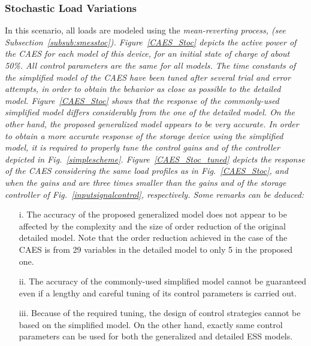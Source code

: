 \documentclass[journal, a4paper]{IEEEtran}
\begin{document}
\subsubsection{Stochastic Load Variations}
\label{subsub:caesstoc}
In this scenario, all loads are modeled using the \it mean-reverting \rm process,
(see Subsection~\ref{subsub:smesstoc}). Figure~\ref{CAES_Stoc}
depicts the active power of the CAES for each model of this device, for an initial state 
of charge of about 50\%. All control parameters are the same for all models. 
The time constants of the simplified model of the CAES have been tuned after several
trial and error attempts, in order to obtain the behavior as close as possible to 
the detailed model. Figure~\ref{CAES_Stoc} shows that the response of the
commonly-used simplified model differs considerably from the one of the detailed model.
On the other hand, the proposed generalized model appears to be very accurate.
In order to obtain a more accurate response of the storage device using
the simplified model, it is required to properly tune the control gains  
and  of the controller depicted in Fig.~\ref{simplescheme}. 
Figure~\ref{CAES_Stoc_tuned} depicts the response of the CAES considering the same 
load profiles as in Fig.~\ref{CAES_Stoc}, and when the gains  
and  are three times smaller than the gains  and
 of the storage controller of Fig.~\ref{inputsignalcontrol}, respectively.
Some remarks can be deduced:
\begin{itemize}
\item[i.]   The accuracy  of the  proposed generalized  model 
  does not appear to be affected by the complexity and the size of order 
  reduction of the original detailed model. Note that the order reduction
  achieved in the case of the CAES is from 29 variables in the detailed model
  to only 5 in the proposed one. 
\item[ii.] The  accuracy of the commonly-used  simplified model cannot
  be guaranteed even  if a lengthy and careful tuning  of its control
  parameters is carried out.
\item[iii.]  Because  of the  required tuning,  the design  of control
  strategies cannot  be based on  the simplified model.  On  the other
  hand,  exactly same  control parameters  can  be used  for both  the
  generalized and detailed  ESS models.  
\end{itemize}






\vspace{-2mm}
\end{document}

